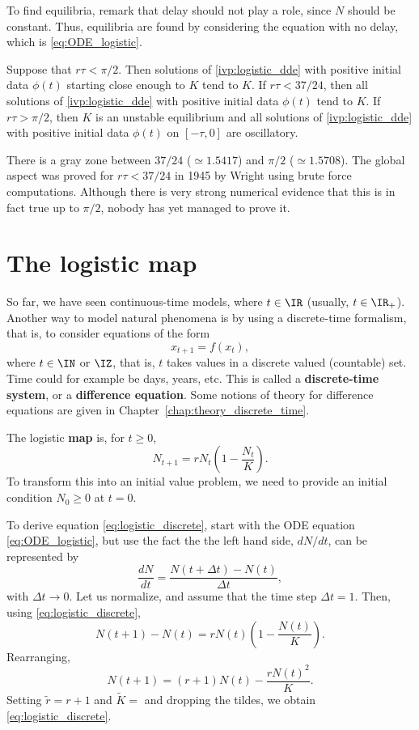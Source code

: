 \vskip0.5cm
To find equilibria, remark that delay should not play a role, since $N$ should be constant. Thus, equilibria are found by considering the equation with no delay, which is \eqref{eq:ODE_logistic}.
\begin{theorem}
Suppose that $r\tau<\pi/2$. Then solutions of \eqref{ivp:logistic_dde} with positive initial data $\phi(t)$ starting close enough to $K$ tend to $K$. If $r\tau<37/24$, then all solutions of  \eqref{ivp:logistic_dde} with positive initial data $\phi(t)$ tend to $K$. If $r\tau>\pi/2$, then $K$ is an unstable equilibrium and all solutions of \eqref{ivp:logistic_dde} with positive initial data $\phi(t)$ on $[-\tau,0]$ are oscillatory.
\end{theorem}
There is a gray zone between $37/24$ ($\simeq 1.5417$) and $\pi/2$ ($\simeq 1.5708$). The global aspect was proved for $r\tau<37/24$ in 1945 by Wright \cite{Wright1955} using brute force computations. Although there is very strong numerical evidence that this is in fact true up to $\pi/2$, nobody has yet managed to prove it.

\section{The logistic map}
\label{sec:DE_logistic}

So far, we have seen continuous-time models, where $t\in\IR$ (usually, $t\in\IR_+$). Another way to model natural phenomena is by using a discrete-time formalism, that is, to consider equations of the form
\[
x_{t+1}=f(x_t),
\]
where $t\in\IN$ or $\IZ$, that is, $t$ takes values in a discrete valued (countable) set.
Time could for example be days, years, etc. This is called a \textbf{discrete-time system}, or a \textbf{difference equation}.
Some notions of theory for difference equations are given in Chapter~\ref{chap:theory_discrete_time}.



The logistic \textbf{map} is, for $t\geq 0$,
\begin{equation}\label{eq:logistic_discrete}
N_{t+1}=rN_t\left(1-\frac{N_t}K\right).
\end{equation}
To transform this into an initial value problem, we need to provide an initial condition $N_0\geq 0$ at $t=0$.

To derive equation \eqref{eq:logistic_discrete}, start with the ODE equation \eqref{eq:ODE_logistic}, but use the fact the the left hand side, $dN/dt$, can be represented by
\[
\frac{dN}{dt}=\frac{N(t+\Delta t)-N(t)}{\Delta t},
\]
with $\Delta t\to 0$. Let us normalize, and assume that the time step $\Delta t=1$. Then, using \eqref{eq:logistic_discrete},
\[
N(t+1)-N(t)=rN(t)\left(1-\frac{N(t)}{K}\right).
\]
Rearranging, 
\[
N(t+1)=(r+1)N(t)-\frac{rN(t)^2}{K}.
\]
Setting $\tilde r=r+1$ and $\tilde K=$ and dropping the tildes, we obtain \eqref{eq:logistic_discrete}.

